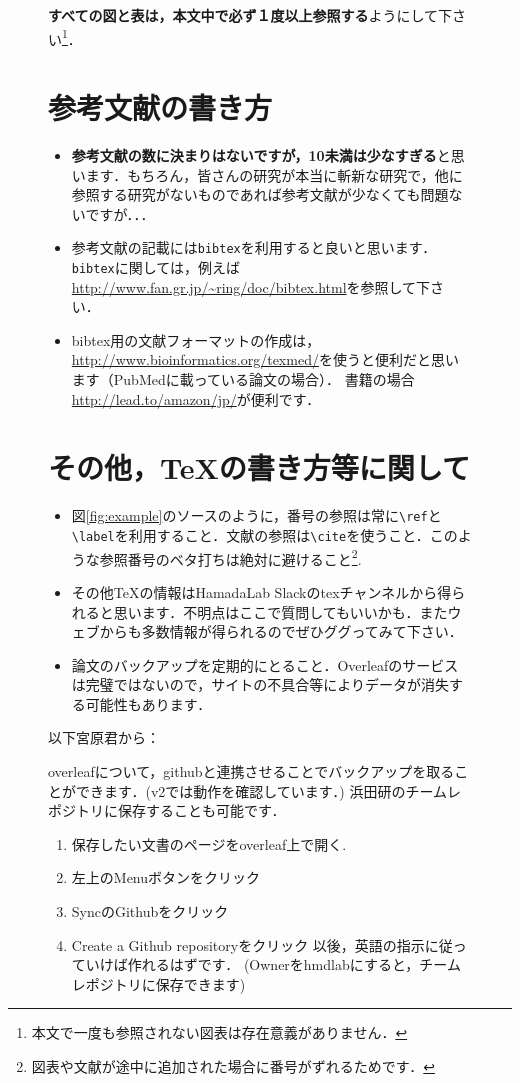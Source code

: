 \documentclass[dvipdfmx,autodetect-engine]{jsreport}
\begin{document}
\begin{figure}[h]
{\textbf{すべての図と表は，本文中で必ず１度以上参照する}ようにして下さい\footnote{本文で一度も参照されない図表は存在意義がありません．}．

\section{参考文献の書き方}

\begin{itemize}
\item \textbf{参考文献の数に決まりはないですが，10未満は少なすぎる}と思います．もちろん，皆さんの研究が本当に斬新な研究で，他に参照する研究がないものであれば参考文献が少なくても問題ないですが．．．
\item 参考文献の記載には\texttt{bibtex}を利用すると良いと思います．
\texttt{bibtex}に関しては，例えば\url{http://www.fan.gr.jp/~ring/doc/bibtex.html}を参照して下さい．
%
\item bibtex用の文献フォーマットの作成は，\url{http://www.bioinformatics.org/texmed/}を使うと便利だと思います（PubMedに載っている論文の場合）．
書籍の場合\url{http://lead.to/amazon/jp/}が便利です．
\end{itemize}



\section{その他，\TeX の書き方等に関して}

\begin{itemize}
\item 図\ref{fig:example}のソースのように，番号の参照は常に\texttt{\textbackslash ref}と\texttt{\textbackslash label}を利用すること．文献の参照は\texttt{\textbackslash cite}を使うこと．このような参照番号のベタ打ちは絶対に避けること\footnote{図表や文献が途中に追加された場合に番号がずれるためです．}.
\item その他\TeX の情報はHamadaLab Slackのtexチャンネルから得られると思います．不明点はここで質問してもいいかも．またウェブからも多数情報が得られるのでぜひググってみて下さい．
\item 論文のバックアップを定期的にとること．Overleafのサービスは完璧ではないので，サイトの不具合等によりデータが消失する可能性もあります．
\end{itemize}

以下宮原君から：

overleafについて，githubと連携させることでバックアップを取ることができます．(v2では動作を確認しています．)
浜田研のチームレポジトリに保存することも可能です．
\begin{enumerate}
\item 保存したい文書のページをoverleaf上で開く.
\item 左上のMenuボタンをクリック
\item SyncのGithubをクリック
\item Create a Github repositoryをクリック
以後，英語の指示に従っていけば作れるはずです．
(Ownerをhmdlabにすると，チームレポジトリに保存できます)
\end{enumerate}


}
\end{figure}
\end{document}
